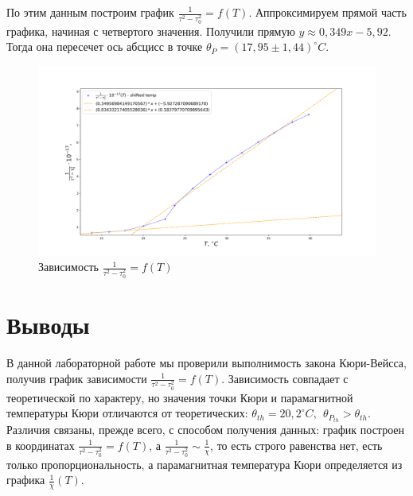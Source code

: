 \documentclass[a4paper, 12pt]{article}
\begin{document}
По этим данным построим график $\frac{1}{\tau^2 - \tau_0^2} = f(T)$. Аппроксимируем прямой часть графика, начиная с четвертого значения. Получили прямую $y \approx 0,349x - 5,92$. Тогда она пересечет ось абсцисс в точке $\theta_P = (17,95 \pm 1,44) ^{\circ}C $.
\begin{figure}[h!]
    \centering
    \includegraphics[width = \textwidth]{lol.png}
    \caption{Зависимость $\frac{1}{\tau^2 - \tau_0^2} = f(T)$}
\end{figure}
\section*{Выводы}
В данной лабораторной работе мы проверили выполнимость закона Кюри-Вейсса, получив график зависимости $\frac{1}{\tau^2 - \tau_0^2} = f(T)$. Зависимость совпадает с теоретической по характеру, но значения точки Кюри и парамагнитной температуры Кюри отличаются от теоретических: $\theta_{th} = 20,2^{\circ}C, \ \ \theta_{P_{th}}  > \theta_{th}$. Различия связаны, прежде всего, с способом получения данных: график построен в координатах $\frac{1}{\tau^2 - \tau_0^2} = f(T)$, а $\frac{1}{\tau^2 - \tau_0^2} \sim \frac{1}{\chi}$, то есть строго равенства нет, есть только пропорциональность, а парамагнитная температура Кюри определяется из графика $\frac{1}{\chi}(T)$.
\end{document}
